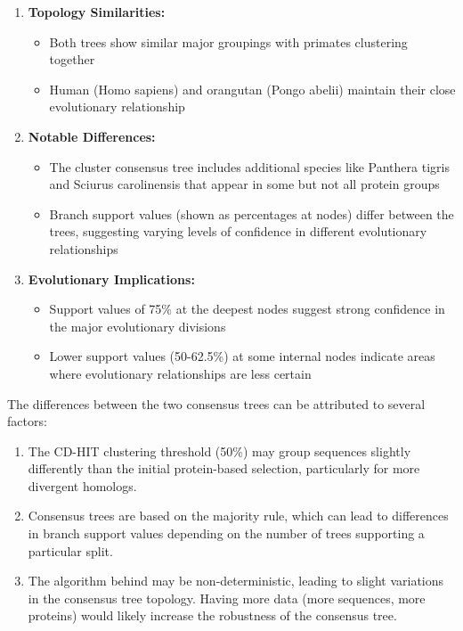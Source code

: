 \documentclass[11pt, a4paper, hidelinks]{article}
\begin{document}
\begin{enumerate}
    \item \textbf{Topology Similarities:}
    \begin{itemize}
        \item Both trees show similar major groupings with primates clustering together
        \item Human (Homo sapiens) and orangutan (Pongo abelii) maintain their close evolutionary relationship
    \end{itemize}

    \item \textbf{Notable Differences:}
    \begin{itemize}
        \item The cluster consensus tree includes additional species like Panthera tigris and Sciurus carolinensis that appear in some but not all protein groups
        \item Branch support values (shown as percentages at nodes) differ between the trees, suggesting varying levels of confidence in different evolutionary relationships
    \end{itemize}

    \item \textbf{Evolutionary Implications:}
    \begin{itemize}
        \item Support values of 75\% at the deepest nodes suggest strong confidence in the major evolutionary divisions
        \item Lower support values (50-62.5\%) at some internal nodes indicate areas where evolutionary relationships are less certain
    \end{itemize}
\end{enumerate}

The differences between the two consensus trees can be attributed to several factors:

\begin{enumerate}
    \item The CD-HIT clustering threshold (50\%) may group sequences slightly differently than the initial protein-based selection, particularly for more divergent homologs.
    \item Consensus trees are based on the majority rule, which can lead to differences in branch support values depending on the number of trees supporting a particular split.
    \item The algorithm behind may be non-deterministic, leading to slight variations in the consensus tree topology. Having more data (more sequences, more proteins) would likely increase the robustness of the consensus tree.
\end{enumerate}
\end{document}
